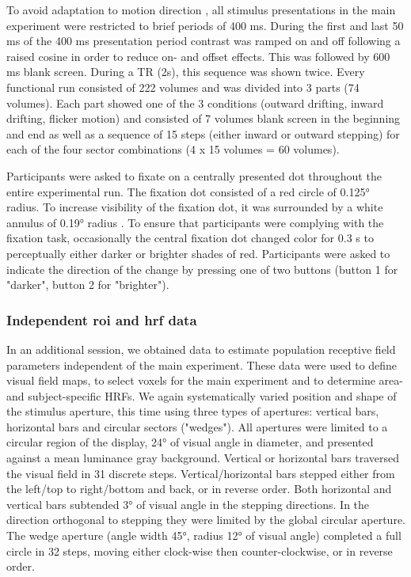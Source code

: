 To avoid adaptation to motion direction \parencite{Fu2004, Schellart2004}, all stimulus presentations in the main experiment were restricted to brief periods of 400 ms. During the first and last 50 ms of the 400 ms presentation period contrast was ramped on and off following a raised cosine in order to reduce on- and offset effects. This was followed by 600 ms blank screen. During a TR (2s), this sequence was shown twice. Every functional run consisted of 222 volumes and was divided into 3 parts (74 volumes). Each part showed one of the 3 conditions (outward drifting, inward drifting, flicker motion) and consisted of 7 volumes blank screen in the beginning and end as well as a sequence of 15 steps (either inward or outward stepping) for each of the four sector combinations (4 x 15 volumes = 60 volumes).

Participants were asked to fixate on a centrally presented dot throughout the entire experimental run. The fixation dot consisted of a red circle of 0.125° radius. To increase visibility of the fixation dot, it was surrounded by a white annulus of 0.19° radius \parencite{Harvey2016}. To ensure that participants were complying with the fixation task, occasionally the central fixation dot changed color for 0.3 s to perceptually either darker or brighter shades of red. Participants were asked to indicate the direction of the change by pressing one of two buttons (button 1 for "darker", button 2 for "brighter").

\subsubsection{Independent roi and hrf data}
In an additional session, we obtained data to estimate population receptive field parameters independent of the main experiment. These data were used to define visual field maps, to select voxels for the main experiment and to determine area- and subject-specific HRFs. We again systematically varied position and shape of the stimulus aperture, this time using three types of apertures: vertical bars, horizontal bars and circular sectors ("wedges"). All apertures were limited to a circular region of the display, 24° of visual angle in diameter, and presented against a mean luminance gray background. Vertical or horizontal bars traversed the visual field in 31 discrete steps. Vertical/horizontal bars stepped either from the left/top to right/bottom and back, or in reverse order. Both horizontal and vertical bars subtended 3° of visual angle in the stepping directions. In the direction orthogonal to stepping they were limited by the global circular aperture. The wedge aperture (angle width 45°, radius 12° of visual angle) completed a full circle in 32 steps, moving either clock-wise then counter-clockwise, or in reverse order.

